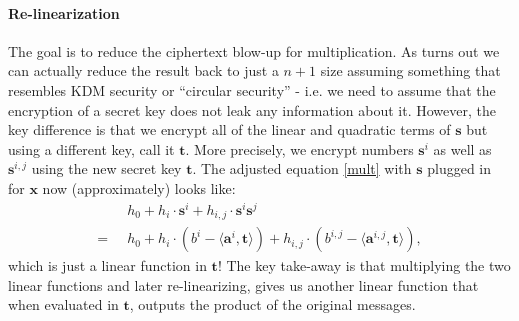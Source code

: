 \paragraph{Re-linearization}
The goal is to reduce the ciphertext blow-up for multiplication. As turns out we can actually reduce the result back to just a $n+1$ size assuming something that resembles KDM security or ``circular security'' - i.e. we need to assume that the encryption of a secret key does not leak any information about it. However, the key difference is that we encrypt all of the linear and quadratic terms of $\bm{s}$ but using a different key, call it $\bm{t}$. More precisely, we encrypt numbers $\bm{s}^i$ as well as $\bm{s}^{i,j}$ using the new secret key $\bm{t}$. The adjusted equation \ref{mult} with $\bm{s}$ plugged in for $\bm{x}$ now (approximately) looks like: 
\begin{align*}
  & h_0 + h_i \cdot \bm{s}^i + h_{i,j} \cdot \bm{s}^i \bm{s}^j\\
  = \; \; & h_0 + h_i \cdot (b^i - \langle \bm{a}^i, \bm{t} \rangle) + h_{i,j} \cdot (b^{i,j} - \langle \bm{a}^{i,j}, \bm{t} \rangle), 
\end{align*}
which is just a linear function in $\bm{t}$! The key take-away is that multiplying the two linear functions and later re-linearizing, gives us another linear function that when evaluated in $\bm{t}$, outputs the product of the original messages.
